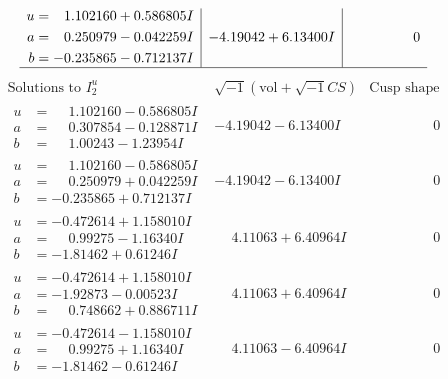 \documentclass[1p]{elsarticle_modified}
\theoremstyle{definition}
\newcommand{\I}{\sqrt{-1}}
\begin{document}
$$\begin{array}{c|c|c}
\begin{aligned}
u &= \phantom{-}1.102160 + 0.586805 I \\
a &= \phantom{-}0.250979 - 0.042259 I \\
b &= -0.235865 - 0.712137 I\end{aligned}
 & -4.19042 + 6.13400 I & \phantom{-0.000000 } 0\\
 \hline 
 \end{array}$$\newpage$$\begin{array}{c|c|c}  
\text{Solutions to }I^u_{2}& \I (\text{vol} + \sqrt{-1}CS) & \text{Cusp shape}\\
 \hline 
\begin{aligned}
u &= \phantom{-}1.102160 - 0.586805 I \\
a &= \phantom{-}0.307854 - 0.128871 I \\
b &= \phantom{-}1.00243 - 1.23954 I\end{aligned}
 & -4.19042 - 6.13400 I & \phantom{-0.000000 } 0 \\ \hline\begin{aligned}
u &= \phantom{-}1.102160 - 0.586805 I \\
a &= \phantom{-}0.250979 + 0.042259 I \\
b &= -0.235865 + 0.712137 I\end{aligned}
 & -4.19042 - 6.13400 I & \phantom{-0.000000 } 0 \\ \hline\begin{aligned}
u &= -0.472614 + 1.158010 I \\
a &= \phantom{-}0.99275 - 1.16340 I \\
b &= -1.81462 + 0.61246 I\end{aligned}
 & \phantom{-}4.11063 + 6.40964 I & \phantom{-0.000000 } 0 \\ \hline\begin{aligned}
u &= -0.472614 + 1.158010 I \\
a &= -1.92873 - 0.00523 I \\
b &= \phantom{-}0.748662 + 0.886711 I\end{aligned}
 & \phantom{-}4.11063 + 6.40964 I & \phantom{-0.000000 } 0 \\ \hline\begin{aligned}
u &= -0.472614 - 1.158010 I \\
a &= \phantom{-}0.99275 + 1.16340 I \\
b &= -1.81462 - 0.61246 I\end{aligned}
 & \phantom{-}4.11063 - 6.40964 I & \phantom{-0.000000 } 0 \\ \hline\begin{aligned}

\end{aligned}
\end{array}$$
\end{document}
